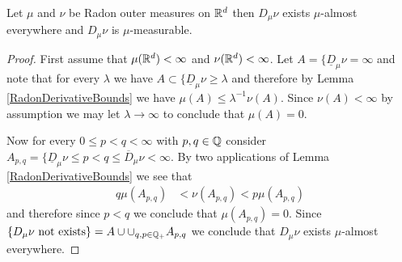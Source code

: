 \begin{thm}\label{ExistenceMeasurabilityRadonDerivatives}Let $\mu$ and $\nu$ be Radon outer measures on $\mathbb{R}^d$ then $D_\mu \nu$ exists $\mu$-almost everywhere and $D_\mu \nu$ is $\mu$-measurable.
\end{thm}
\begin{proof}
First assume that $\mu(\mathbb{R}^d)<\infty$ and $\nu(\mathbb{R}^d)<\infty$.
Let $A = \lbrace \underline{D}_\mu \nu = \infty$ and note that for every $\lambda$ we have  $A \subset \lbrace \underline{D}_\mu \nu \geq \lambda$ and therefore by Lemma \ref{RadonDerivativeBounds} we have $\mu(A) \leq \lambda^{-1} \nu(A)$.  Since $\nu(A) < \infty$ by assumption we may let $\lambda \to \infty$ to conclude that $\mu(A) = 0$.

Now for every $0 \leq p < q < \infty$ with $p,q \in \mathbb{Q}$ consider $A_{p,q} = \lbrace \underline{D}_\mu \nu \leq p < q \leq \overline{D}_\mu \nu < \infty$.  By two applications
of Lemma \ref{RadonDerivativeBounds} we see that 
\begin{align*}
 q \mu(A_{p,q}) &< \nu(A_{p,q}) < p \mu(A_{p,q})
\end{align*}
and therefore since $p < q$ we conclude that $\mu(A_{p,q}) = 0$.  Since $\lbrace D_\mu \nu \text{ not exists} \rbrace = A \cup \cup_{q,p \in \mathbb{Q}_+} A_{p,q}$ we conclude that $D_\mu \nu$ exists $\mu$-almost everywhere.


\end{proof}
